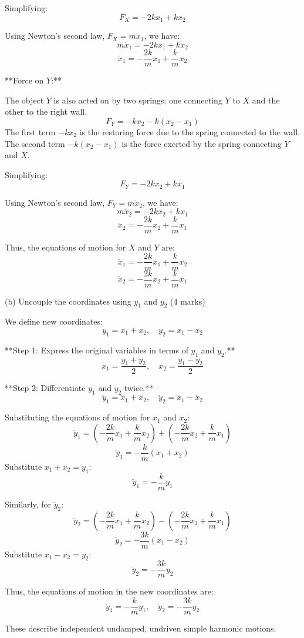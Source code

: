 \documentclass{article}
\begin{document}
Simplifying:
\[
F_X = -2k x_1 + k x_2
\]

Using Newton's second law, $F_X = m \ddot{x}_1$, we have:
\[
m \ddot{x}_1 = -2k x_1 + k x_2
\]
\[
\ddot{x}_1 = -\frac{2k}{m} x_1 + \frac{k}{m} x_2
\]

**Force on $Y$:**

The object $Y$ is also acted on by two springs: one connecting $Y$ to $X$ and the other to the right wall.
\[
F_Y = -k x_2 - k (x_2 - x_1)
\]
The first term $-k x_2$ is the restoring force due to the spring connected to the wall. The second term $-k (x_2 - x_1)$ is the force exerted by the spring connecting $Y$ and $X$.

Simplifying:
\[
F_Y = -2k x_2 + k x_1
\]

Using Newton's second law, $F_Y = m \ddot{x}_2$, we have:
\[
m \ddot{x}_2 = -2k x_2 + k x_1
\]
\[
\ddot{x}_2 = -\frac{2k}{m} x_2 + \frac{k}{m} x_1
\]

Thus, the equations of motion for $X$ and $Y$ are:
\[
\ddot{x}_1 = -\frac{2k}{m} x_1 + \frac{k}{m} x_2
\]
\[
\ddot{x}_2 = -\frac{2k}{m} x_2 + \frac{k}{m} x_1
\]

(b) Uncouple the coordinates using $y_1$ and $y_2$ (4 marks)

We define new coordinates:
\[
y_1 = x_1 + x_2, \quad y_2 = x_1 - x_2
\]

**Step 1: Express the original variables in terms of $y_1$ and $y_2$.**
\[
x_1 = \frac{y_1 + y_2}{2}, \quad x_2 = \frac{y_1 - y_2}{2}
\]

**Step 2: Differentiate $y_1$ and $y_2$ twice.**
\[
\ddot{y}_1 = \ddot{x}_1 + \ddot{x}_2, \quad \ddot{y}_2 = \ddot{x}_1 - \ddot{x}_2
\]

Substituting the equations of motion for $\ddot{x}_1$ and $\ddot{x}_2$:
\[
\ddot{y}_1 = \left(-\frac{2k}{m} x_1 + \frac{k}{m} x_2\right) + \left(-\frac{2k}{m} x_2 + \frac{k}{m} x_1\right)
\]
\[
\ddot{y}_1 = -\frac{k}{m}(x_1 + x_2)
\]
Substitute $x_1 + x_2 = y_1$:
\[
\ddot{y}_1 = -\frac{k}{m} y_1
\]

Similarly, for $\ddot{y}_2$:
\[
\ddot{y}_2 = \left(-\frac{2k}{m} x_1 + \frac{k}{m} x_2\right) - \left(-\frac{2k}{m} x_2 + \frac{k}{m} x_1\right)
\]
\[
\ddot{y}_2 = -\frac{3k}{m}(x_1 - x_2)
\]
Substitute $x_1 - x_2 = y_2$:
\[
\ddot{y}_2 = -\frac{3k}{m} y_2
\]

Thus, the equations of motion in the new coordinates are:
\[
\ddot{y}_1 = -\frac{k}{m} y_1, \quad \ddot{y}_2 = -\frac{3k}{m} y_2
\]

These describe independent undamped, undriven simple harmonic motions.
\end{document}
